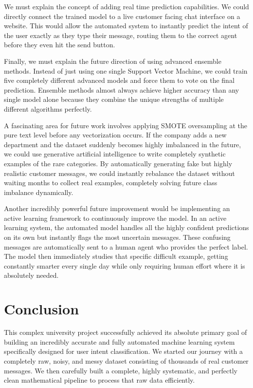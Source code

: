 \documentclass[12pt]{article}
\begin{document}
We must explain the concept of adding real time prediction capabilities. We could directly connect the trained model to a live customer facing chat interface on a website. This would allow the automated system to instantly predict the intent of the user exactly as they type their message, routing them to the correct agent before they even hit the send button. 

Finally, we must explain the future direction of using advanced ensemble methods. Instead of just using one single Support Vector Machine, we could train five completely different advanced models and force them to vote on the final prediction. Ensemble methods almost always achieve higher accuracy than any single model alone because they combine the unique strengths of multiple different algorithms perfectly.


A fascinating area for future work involves applying SMOTE oversampling at the pure text level before any vectorization occurs. If the company adds a new department and the dataset suddenly becomes highly imbalanced in the future, we could use generative artificial intelligence to write completely synthetic examples of the rare categories. By automatically generating fake but highly realistic customer messages, we could instantly rebalance the dataset without waiting months to collect real examples, completely solving future class imbalance dynamically.

Another incredibly powerful future improvement would be implementing an active learning framework to continuously improve the model. In an active learning system, the automated model handles all the highly confident predictions on its own but instantly flags the most uncertain messages. These confusing messages are automatically sent to a human agent who provides the perfect label. The model then immediately studies that specific difficult example, getting constantly smarter every single day while only requiring human effort where it is absolutely needed.

\section{Conclusion}
This complex university project successfully achieved its absolute primary goal of building an incredibly accurate and fully automated machine learning system specifically designed for user intent classification. We started our journey with a completely raw, noisy, and messy dataset consisting of thousands of real customer messages. We then carefully built a complete, highly systematic, and perfectly clean mathematical pipeline to process that raw data efficiently. 
\end{document}

